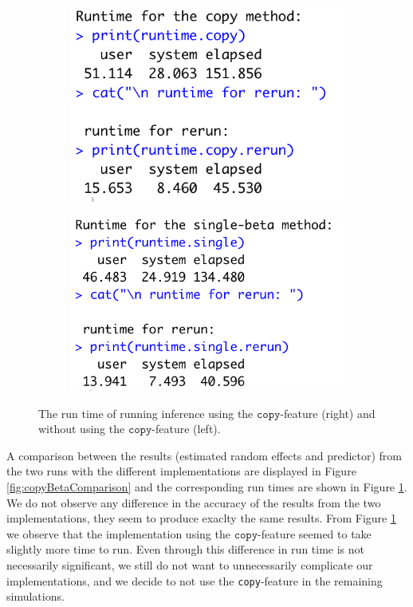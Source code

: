 \begin{figure}[h!]
    \centering
    \begin{subfigure}[b]{0.45\textwidth}
        \centering
        \includegraphics[trim=0 5 0 0,clip,width=\textwidth]{synthetic-data/Figures/runtime-copy.png}
    \end{subfigure}
    \begin{subfigure}[b]{0.45\textwidth}
        \centering
        \includegraphics[trim=0 0 15 0,clip, width=\textwidth]{synthetic-data/Figures/runtime-single.png}
    \end{subfigure}
    \caption{The run time of running \inlabru inference using the $\texttt{copy}$-feature (right) and without using the $\texttt{copy}$-feature (left).}
    \label{fig:copyBetaRuntimes}
\end{figure}

A comparison between the results (estimated random effects and predictor) from the two runs with the different implementations are displayed in Figure \ref{fig:copyBetaComparison} and the corresponding run times are shown in Figure \ref{fig:copyBetaRuntimes}. We do not observe any difference in the accuracy of the results from the two implementations, they seem to produce exaclty the same results. From Figure \ref{fig:copyBetaRuntimes} we observe that the implementation using the $\texttt{copy}$-feature seemed to take slightly more time to run. Even through this difference in run time is not necessarily significant, we still do not want to unnecessarily complicate our implementations, and we decide to not use the \texttt{copy}-feature in the remaining simulations.

